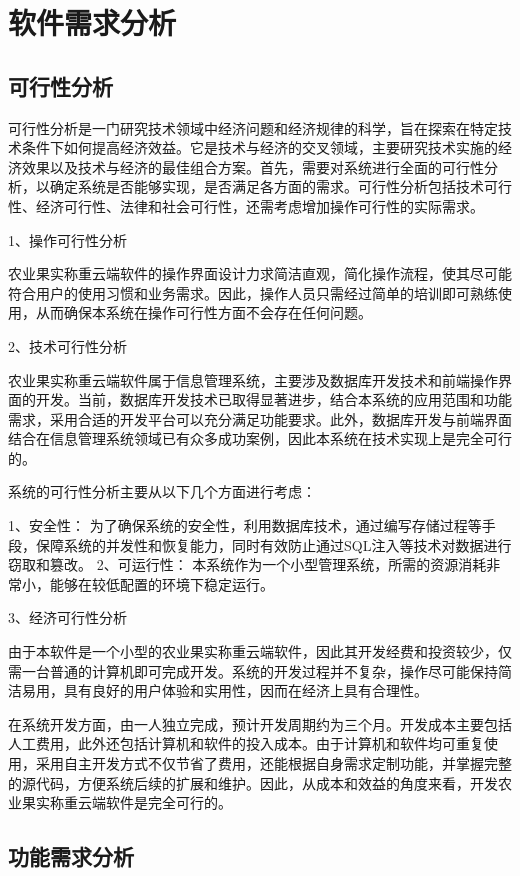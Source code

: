 \chapter{软件需求分析}

\section{可行性分析}

可行性分析是一门研究技术领域中经济问题和经济规律的科学，旨在探索在特定技术条件下如何提高经济效益。它是技术与经济的交叉领域，主要研究技术实施的经济效果以及技术与经济的最佳组合方案。首先，需要对系统进行全面的可行性分析，以确定系统是否能够实现，是否满足各方面的需求。可行性分析包括技术可行性、经济可行性、法律和社会可行性，还需考虑增加操作可行性的实际需求。

1、操作可行性分析

农业果实称重云端软件的操作界面设计力求简洁直观，简化操作流程，使其尽可能符合用户的使用习惯和业务需求。因此，操作人员只需经过简单的培训即可熟练使用，从而确保本系统在操作可行性方面不会存在任何问题。

2、技术可行性分析

农业果实称重云端软件属于信息管理系统，主要涉及数据库开发技术和前端操作界面的开发。当前，数据库开发技术已取得显著进步，结合本系统的应用范围和功能需求，采用合适的开发平台可以充分满足功能要求。此外，数据库开发与前端界面结合在信息管理系统领域已有众多成功案例，因此本系统在技术实现上是完全可行的。

系统的可行性分析主要从以下几个方面进行考虑：
	
1、安全性：
    为了确保系统的安全性，利用数据库技术，通过编写存储过程等手段，保障系统的并发性和恢复能力，同时有效防止通过SQL注入等技术对数据进行窃取和篡改。
2、可运行性：
    本系统作为一个小型管理系统，所需的资源消耗非常小，能够在较低配置的环境下稳定运行。

3、经济可行性分析

由于本软件是一个小型的农业果实称重云端软件，因此其开发经费和投资较少，仅需一台普通的计算机即可完成开发。系统的开发过程并不复杂，操作尽可能保持简洁易用，具有良好的用户体验和实用性，因而在经济上具有合理性。

在系统开发方面，由一人独立完成，预计开发周期约为三个月。开发成本主要包括人工费用，此外还包括计算机和软件的投入成本。由于计算机和软件均可重复使用，采用自主开发方式不仅节省了费用，还能根据自身需求定制功能，并掌握完整的源代码，方便系统后续的扩展和维护。因此，从成本和效益的角度来看，开发农业果实称重云端软件是完全可行的。

\section{功能需求分析}

